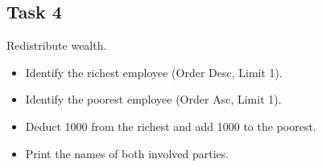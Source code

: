 \documentclass[12pt,a4paper]{article}
\newif\ifshowsolutions
\begin{document}
\subsection*{Task 4}
Redistribute wealth.
\begin{itemize}
    \item Identify the richest employee (Order Desc, Limit 1).
    \item Identify the poorest employee (Order Asc, Limit 1).
    \item Deduct 1000 from the richest and add 1000 to the poorest.
    \item Print the names of both involved parties.
\end{itemize}

\ifshowsolutions
\textbf{Solution:}
\begin{lstlisting}[language=SQL]
DO $$ 
DECLARE
    v_rich_id INT;
    v_poor_id INT;
    v_rich_name TEXT;
    v_poor_name TEXT;
BEGIN
    -- Find Richest
    SELECT employee_id, first_name INTO v_rich_id, v_rich_name 
    FROM employees ORDER BY salary DESC LIMIT 1;

    -- Find Poorest
    SELECT employee_id, first_name INTO v_poor_id, v_poor_name 
    FROM employees ORDER BY salary ASC LIMIT 1;

    -- Execute Transfer
    UPDATE employees SET salary = salary - 1000 WHERE employee_id = v_rich_id;
    UPDATE employees SET salary = salary + 1000 WHERE employee_id = v_poor_id;

    RAISE NOTICE 'Transferred 1000 from % to %', v_rich_name, v_poor_name;
END $$;
\end{lstlisting}
\fi
\end{document}
